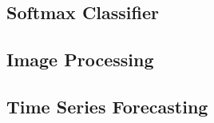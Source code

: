 
\subsection{Softmax Classifier}

\subsection{Image Processing}

\subsection{Time Series Forecasting}

